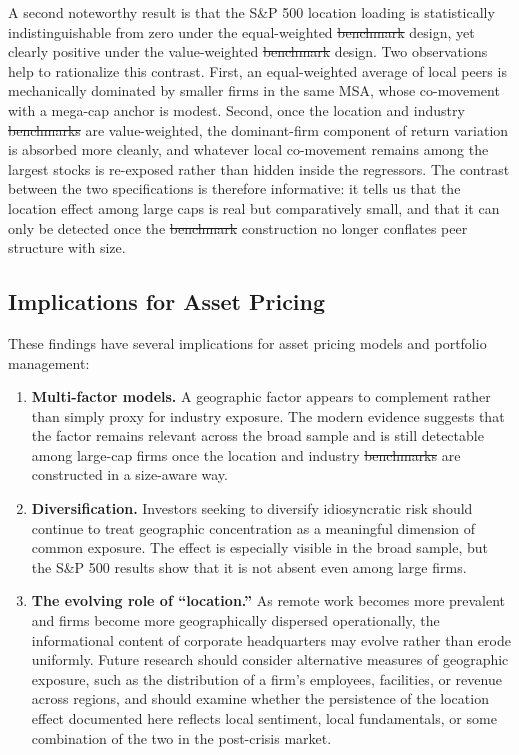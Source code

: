\documentclass[
  12pt,
]{article}
\providecommand{\DIFaddtex}[1]{{\protect\color{blue}\uwave{#1}}} %
\providecommand{\DIFdeltex}[1]{{\protect\color{red}\sout{#1}}}                      %
\providecommand{\DIFaddbegin}{} %
\providecommand{\DIFaddend}{} %
\providecommand{\DIFdelbegin}{} %
\providecommand{\DIFdelend}{} %
\providecommand{\DIFadd}[1]{\texorpdfstring{\DIFaddtex{#1}}{#1}} %
\providecommand{\DIFdel}[1]{\texorpdfstring{\DIFdeltex{#1}}{}} %
\newcommand{\DIFscaledelfig}{0.5}
\newlength{\DIFdelgraphicswidth} %
\newlength{\DIFdelgraphicsheight} %
\newcommand{\DIFaddincludegraphics}[2][]{{\color{blue}\fbox{\DIFOincludegraphics[#1]{#2}}}} %
\newcommand{\DIFdelincludegraphics}[2][]{%
\sbox{\DIFdelgraphicsbox}{\DIFOincludegraphics[#1]{#2}}%
\settoboxwidth{\DIFdelgraphicswidth}{\DIFdelgraphicsbox} %
\settoboxtotalheight{\DIFdelgraphicsheight}{\DIFdelgraphicsbox} %
\scalebox{\DIFscaledelfig}{%
\parbox[b]{\DIFdelgraphicswidth}{\usebox{\DIFdelgraphicsbox}\\[-\baselineskip] \rule{\DIFdelgraphicswidth}{0em}}\llap{\resizebox{\DIFdelgraphicswidth}{\DIFdelgraphicsheight}{%
\setlength{\unitlength}{\DIFdelgraphicswidth}%
\begin{picture}(1,1)%
\thicklines\linethickness{2pt} %
{\color[rgb]{1,0,0}\put(0,0){\framebox(1,1){}}}%
{\color[rgb]{1,0,0}\put(0,0){\line( 1,1){1}}}%
{\color[rgb]{1,0,0}\put(0,1){\line(1,-1){1}}}%
\end{picture}%
}\hspace*{3pt}}} %
} %
\DeclareRobustCommand{\DIFaddbegin}{\DIFOaddbegin \let\includegraphics\DIFaddincludegraphics} %
\DeclareRobustCommand{\DIFaddend}{\DIFOaddend \let\includegraphics\DIFOincludegraphics} %
\DeclareRobustCommand{\DIFdelbegin}{\DIFOdelbegin \let\includegraphics\DIFdelincludegraphics} %
\DeclareRobustCommand{\DIFdelend}{\DIFOaddend \let\includegraphics\DIFOincludegraphics} %
\begin{document}
A second noteworthy result is that the S\&P 500 location loading is
statistically indistinguishable from zero under the equal-weighted \DIFdelbegin \DIFdel{benchmark }\DIFdelend \DIFaddbegin \DIFadd{index
}\DIFaddend design, yet clearly positive under the value-weighted \DIFdelbegin \DIFdel{benchmark }\DIFdelend \DIFaddbegin \DIFadd{index }\DIFaddend design. Two
observations help to rationalize this contrast. First, an equal-weighted
average of local peers is mechanically dominated by smaller firms in the
same MSA, whose co-movement with a mega-cap anchor is modest. Second,
once the location and industry \DIFdelbegin \DIFdel{benchmarks }\DIFdelend \DIFaddbegin \DIFadd{indexes }\DIFaddend are value-weighted, the
dominant-firm component of return variation is absorbed more cleanly,
and whatever local co-movement remains among the largest stocks is
re-exposed rather than hidden inside the regressors. The contrast
between the two specifications is therefore informative: it tells us
that the location effect among large caps is real but comparatively
small, and that it can only be detected once the \DIFdelbegin \DIFdel{benchmark }\DIFdelend \DIFaddbegin \DIFadd{index }\DIFaddend construction no
longer conflates peer structure with size.

\subsection{Implications for Asset
Pricing}\label{implications-for-asset-pricing}

These findings have several implications for asset pricing models and
portfolio management:

\begin{enumerate}
\def\labelenumi{\arabic{enumi}.}
\item
  \textbf{Multi-factor models.} A geographic factor appears to
  complement rather than simply proxy for industry exposure. The modern
  evidence suggests that the factor remains relevant across the broad
  sample and is still detectable among large-cap firms once the location
  and industry \DIFdelbegin \DIFdel{benchmarks }\DIFdelend \DIFaddbegin \DIFadd{indexes }\DIFaddend are constructed in a size-aware way.
\item
  \textbf{Diversification.} Investors seeking to diversify idiosyncratic
  risk should continue to treat geographic concentration as a meaningful
  dimension of common exposure. The effect is especially visible in the
  broad sample, but the S\&P 500 results show that it is not absent even
  among large firms.
\item
  \textbf{The evolving role of ``location.''} As remote work becomes
  more prevalent and firms become more geographically dispersed
  operationally, the informational content of corporate headquarters may
  evolve rather than erode uniformly. Future research should consider
  alternative measures of geographic exposure, such as the distribution
  of a firm's employees, facilities, or revenue across regions, and
  should examine whether the persistence of the location effect
  documented here reflects local sentiment, local fundamentals, or some
  combination of the two in the post-crisis market.
\end{enumerate}
\end{document}
